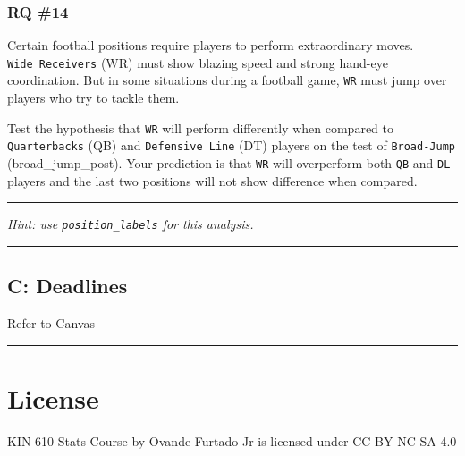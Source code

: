 \documentclass[
]{article}
\begin{document}
\hypertarget{rq-14}{%
\subsubsection{RQ \#14}\label{rq-14}}

Certain football positions require players to perform extraordinary moves. \texttt{Wide\ Receivers} (WR) must show blazing speed and strong hand-eye coordination. But in some situations during a football game, \texttt{WR} must jump over players who try to tackle them.

Test the hypothesis that \texttt{WR} will perform differently when compared to \texttt{Quarterbacks} (QB) and \texttt{Defensive\ Line} (DT) players on the test of \texttt{Broad-Jump} (broad\_jump\_post). Your prediction is that \texttt{WR} will overperform both \texttt{QB} and \texttt{DL} players and the last two positions will not show difference when compared.

\begin{center}\rule{0.5\linewidth}{0.5pt}\end{center}

\emph{Hint: use \texttt{position\_labels} for this analysis.}

\begin{center}\rule{0.5\linewidth}{0.5pt}\end{center}

\hypertarget{deadlines}{%
\subsection{C: Deadlines}\label{deadlines}}

Refer to Canvas

\begin{center}\rule{0.5\linewidth}{0.5pt}\end{center}

\hypertarget{license}{%
\section{License}\label{license}}

KIN 610 Stats Course by Ovande Furtado Jr is licensed under CC BY-NC-SA 4.0
\end{document}
